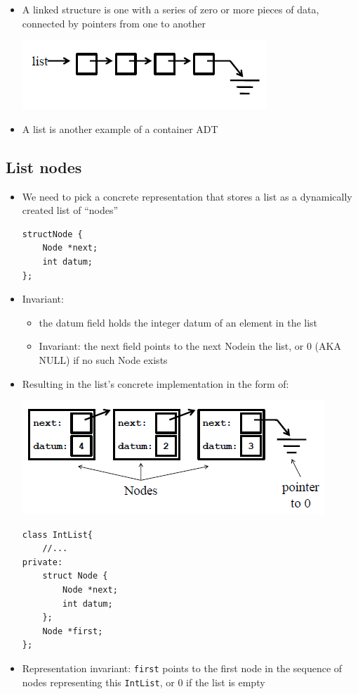 \begin{itemize}
	\item A linked structure is one with a series of zero or more pieces of data, connected by pointers from one to another
	\begin{center}
		\includegraphics{sections/lec18/ll.png}
	\end{center}
	\item A list is another example of a container ADT
\end{itemize}

\subsection{List nodes}
\begin{itemize}
	\item We need to pick a concrete representation that stores a list as a dynamically created list of ``nodes''
\begin{lstlisting}[style=C++]
structNode {
	Node *next;
	int datum;
};
\end{lstlisting}
	\item Invariant:
	\begin{itemize}
		\item the datum field holds the integer datum of an element in the list
		\item Invariant: the next field points to the next Nodein the list, or 0 (AKA NULL) if no such Node exists
	\end{itemize}
	\item Resulting in the list's concrete implementation in the form of:
	\begin{center}
		\includegraphics{sections/lec18/l1.png}
	\end{center}
\begin{lstlisting}[style=C++]
class IntList{
	//...
private:
	struct Node {
		Node *next;
		int datum;
	};
	Node *first;
};
\end{lstlisting}
	\item Representation invariant: \lstinline[style=C++]{first} points to the first node in the sequence of nodes representing this \lstinline[style=C++]{IntList}, or 0 if the list is empty
\end{itemize}

